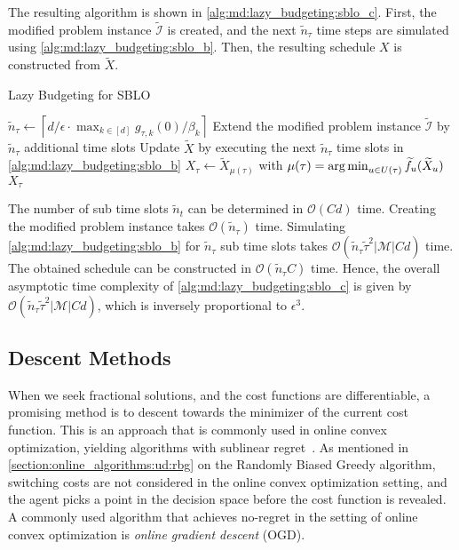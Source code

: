 The resulting algorithm is shown in \cref{alg:md:lazy_budgeting:sblo_c}. First, the modified problem instance $\widetilde{\mathcal{I}}$ is created, and the next $\widetilde{n}_{\tau}$ time steps are simulated using \cref{alg:md:lazy_budgeting:sblo_b}. Then, the resulting schedule $X$ is constructed from $\widetilde{X}$.

\begin{algorithm}
    \caption{Lazy Budgeting for SBLO~\cite{Albers2021_2}}\label{alg:md:lazy_budgeting:sblo_c}
    $\widetilde{n}_{\tau} \gets \left\lceil d / \epsilon \cdot \max_{k \in [d]} g_{\tau,k}(0) / \beta_k\right\rceil$\;
    Extend the modified problem instance $\widetilde{\mathcal{I}}$ by $\widetilde{n}_{\tau}$ additional time slots\;
    Update $\widetilde{X}$ by executing the next $\widetilde{n}_{\tau}$ time slots in \cref{alg:md:lazy_budgeting:sblo_b}\;
    $X_{\tau} \gets \widetilde{X}_{\mu(\tau)}$ with $\mu(\tau) = \operatorname*{arg\,min}_{u \in U(\tau)} \widetilde{f}_u(\widetilde{X}_u)$\;
    \Return $X_{\tau}$\;
\end{algorithm}

The number of sub time slots $\widetilde{n}_t$ can be determined in $\mathcal{O}(C d)$ time. Creating the modified problem instance takes $\mathcal{O}(\widetilde{n}_{\tau})$ time. Simulating \cref{alg:md:lazy_budgeting:sblo_b} for $\widetilde{n}_{\tau}$ sub time slots takes $\mathcal{O}(\widetilde{n}_{\tau} \widetilde{\tau}^2 |\mathcal{M}| C d)$ time. The obtained schedule can be constructed in $\mathcal{O}(\widetilde{n}_{\tau} C)$ time. Hence, the overall asymptotic time complexity of \cref{alg:md:lazy_budgeting:sblo_c} is given by $\mathcal{O}(\widetilde{n}_{\tau} \widetilde{\tau}^2 |\mathcal{M}| C d)$, which is inversely proportional to $\epsilon^3$.

\subsection{Descent Methods}\label{section:online_algorithms:md:descent_methods}

When we seek fractional solutions, and the cost functions are differentiable, a promising method is to descent towards the minimizer of the current cost function. This is an approach that is commonly used in online convex optimization, yielding algorithms with sublinear regret~\cite{Andrew2015}. As mentioned in \cref{section:online_algorithms:ud:rbg} on the Randomly Biased Greedy algorithm, switching costs are not considered in the online convex optimization setting, and the agent picks a point in the decision space before the cost function is revealed. A commonly used algorithm that achieves no-regret in the setting of online convex optimization is \emph{online gradient descent} (OGD).

